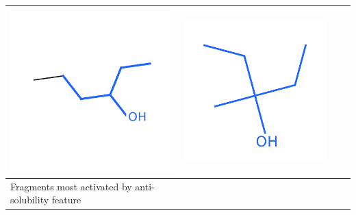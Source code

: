 \documentclass[landscape,a0b,final,a4resizeable]{include/a0poster}
\begin{document}
\begin{poster}
\begin{multicols}{3}
\begin{center}
\begin{tabular}{>{\centering}m{\mywidthb} >{\centering}m{\mywidtha} >{\centering}m{\mywidtha} >{\centering\arraybackslash}m{\mywidtha}}
\includegraphics[width=\mywidtha, clip, trim = 2mm 3mm 2mm 6mm]{figures/fig_6.pdf}\vspace{-1em} &
\includegraphics[width=\mywidtha, clip, trim = 2mm 3mm 2mm 6mm]{figures/fig_7.pdf}\vspace{-1em} \\
\midrule
Fragments most activated by anti-solubility feature & 

\end{tabular}
\end{center}
\end{multicols}
\end{poster}
\end{document}
